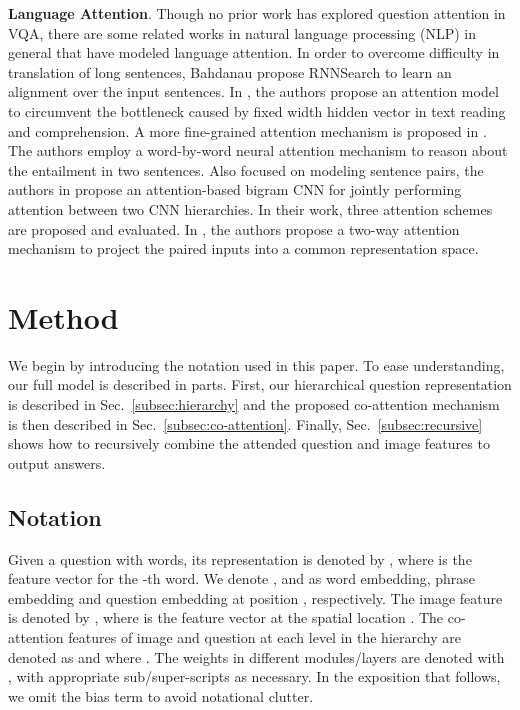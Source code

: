 \documentclass{article}
\begin{document}
\textbf{Language Attention}. Though no prior work has explored question attention in VQA, there are some related works in natural language processing (NLP) in general that have modeled language attention. In order to overcome difficulty in translation of long sentences, Bahdanau \etal \cite{bahdanau2014neural} propose RNNSearch to learn an alignment over the input sentences. In \cite{hermann2015teaching}, the authors propose an attention model to circumvent the bottleneck caused by fixed width hidden vector in text reading and comprehension. A more fine-grained attention mechanism is proposed in \cite{rocktaschel2015reasoning}. The authors employ a word-by-word neural attention mechanism to reason about the entailment in two sentences. Also focused on modeling sentence pairs, the authors in \cite{yin2015abcnn} propose an attention-based bigram CNN for jointly performing attention between two CNN hierarchies. In their work, three attention schemes are proposed and evaluated. In \cite{santos2016attentive}, the authors propose a two-way attention mechanism to project the paired inputs into a common representation space.
%
 \section{Method}
\label{sec:method}
\vspace*{-2mm}
We begin by introducing the notation used in this paper. To ease understanding, our full model is described in parts. First, our hierarchical question representation is described in Sec.~\ref{subsec:hierarchy} and the proposed co-attention mechanism is then described in Sec.~\ref{subsec:co-attention}. Finally, Sec.~\ref{subsec:recursive} shows how to recursively combine the attended question and image features to output answers.
\subsection{Notation}
Given a question with  words, its representation is denoted by , where  is the feature vector for the -th word. We denote ,  and  as word embedding, phrase embedding and question embedding at position , respectively. 
The image feature is denoted by , where  is the feature vector at the spatial location . The co-attention features of image and question at each level in the hierarchy are denoted as  and  where . The weights in different modules/layers are denoted with , with appropriate sub/super-scripts as necessary. In the exposition that follows, we omit the bias term  to avoid notational clutter.
\end{document}
